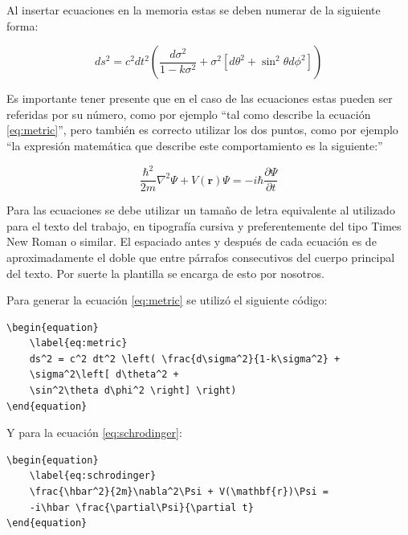 Al insertar ecuaciones en la memoria estas se deben numerar de la siguiente forma:

\begin{equation}
	\label{eq:metric}
	ds^2 = c^2 dt^2 \left( \frac{d\sigma^2}{1-k\sigma^2} + \sigma^2\left[ d\theta^2 + \sin^2\theta d\phi^2 \right] \right)
\end{equation}
                                                        
Es importante tener presente que en el caso de las ecuaciones estas pueden ser referidas por su número, como por ejemplo ``tal como describe la ecuación \ref{eq:metric}'', pero también es correcto utilizar los dos puntos, como por ejemplo ``la expresión matemática que describe este comportamiento es la siguiente:''

\begin{equation}
	\label{eq:schrodinger}
	\frac{\hbar^2}{2m}\nabla^2\Psi + V(\mathbf{r})\Psi = -i\hbar \frac{\partial\Psi}{\partial t}
\end{equation}

Para las ecuaciones se debe utilizar un tamaño de letra equivalente al utilizado para el texto del trabajo, en tipografía cursiva y preferentemente del tipo Times New Roman o similar. El espaciado antes y después de cada ecuación es de aproximadamente el doble que entre párrafos consecutivos del cuerpo principal del texto. Por suerte la plantilla se encarga de esto por nosotros.

Para generar la ecuación \ref{eq:metric} se utilizó el siguiente código:

\begin{verbatim}
\begin{equation}
	\label{eq:metric}
	ds^2 = c^2 dt^2 \left( \frac{d\sigma^2}{1-k\sigma^2} + 
	\sigma^2\left[ d\theta^2 + 
	\sin^2\theta d\phi^2 \right] \right)
\end{equation}
\end{verbatim}

Y para la ecuación \ref{eq:schrodinger}:

\begin{verbatim}
\begin{equation}
	\label{eq:schrodinger}
	\frac{\hbar^2}{2m}\nabla^2\Psi + V(\mathbf{r})\Psi = 
	-i\hbar \frac{\partial\Psi}{\partial t}
\end{equation}

\end{verbatim}

